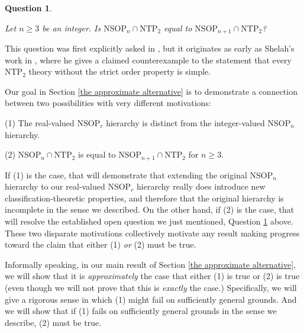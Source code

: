 \documentclass{amsart}
\newtheorem{question}[theorem]{Question}
\theoremstyle{definition}
\theoremstyle{remark}
\numberwithin{equation}{section}
\begin{document}
\begin{question}\label{ntp_2 vs nsop_n}

Let $n \geq 3$ be an integer. Is $\mathrm{NSOP}_{n} \cap \mathrm{NTP}_{2}$ equal to $\mathrm{NSOP}_{n+1} \cap \mathrm{NTP}_{2}$?

\end{question}

This question was first explicitly asked in \cite{Che14}, but it originates as early as Shelah's work in \cite{Sh90}, where he gives a claimed counterexample to the statement that every $\mathrm{NTP}_{2}$ theory without the strict order property is simple.

Our goal in Section \ref{the approximate alternative} is to demonstrate a connection between two possibilities with very different motivations:

(1) The real-valued $\mathrm{NSOP}_{r}$ hierarchy is distinct from the integer-valued $\mathrm{NSOP}_{n}$ hierarchy.

(2) $\mathrm{NSOP}_{n} \cap \mathrm{NTP}_{2}$ is equal to $\mathrm{NSOP}_{n+1} \cap \mathrm{NTP}_{2}$ for $n \geq 3$.


If (1) is the case, that will demonstrate that extending the original $\mathrm{NSOP}_{n}$ hierarchy to our real-valued $\mathrm{NSOP}_{r}$ hierarchy really does introduce new classification-theoretic properties, and therefore that the original hierarchy is incomplete in the sense we described. On the other hand, if (2) is the case, that will resolve the established open question we just mentioned, Question \ref{ntp_2 vs nsop_n} above. These two disparate motivations collectively motivate any result making progress toward the claim that either (1) \textit{or} (2) must be true.

Informally speaking, in our main result of Section \ref{the approximate alternative}, we will show that it is \textit{approximately} the case that either (1) is true or (2) is true (even though we will not prove that this is \textit{exactly} the case.) Specifically, we will give a rigorous sense in which (1) might fail on sufficiently general grounds. And we will show that if (1) fails on sufficiently general grounds in the sense we describe, (2) must be true.
\end{document}
